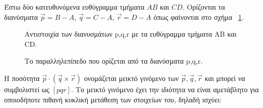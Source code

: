 Έστω δύο κατευθυνόμενα ευθύγραμμα τμήματα $AB$ και $CD$. Ορίζονται τα διανύσματα $\vec{p} = B -A$, $\vec{q} = C -A$, $\vec{r} = D -A$ όπως φαίνονται στο σχήμα ~\ref{fig3}.
\begin{figure}[t!]
\caption{Αντιστοιχία των διανυσμάτων p,q,r με τα ευθύγραμμα τμήματα AB και CD. }
\label{fig3}
\end{figure}
\begin{figure}[b!]
\caption{Το παραλληλεπίπεδο που ορίζεται από τα διανύσματα p,q,r.}
\label{fig4}
\end{figure}
Η ποσότητα $\vec{p} \cdot (\vec{q} \times \vec{r})$ ονομάζεται  μεικτό γινόμενο των $\vec{p},\vec{q},\vec{r}$ και μπορεί να συμβολιστεί ως $[p q r]$. Το μεικτό γινόμενο έχει την ιδιότητα να είναι αμετάβλητο για οποιοδήποτε πιθανή κυκλική μετάθεση των στοιχείων του, δηλαδή ισχύει:

